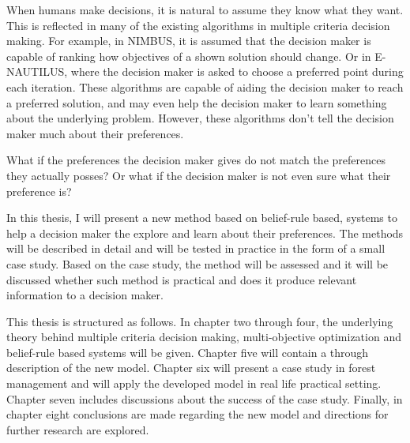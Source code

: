 When humans make decisions, it is natural to assume they know what they want.
This is reflected in many of the existing algorithms in multiple criteria decision making.
For example, in NIMBUS, it is assumed that the decision maker is capable of ranking how objectives
of a shown solution should change. Or in E-NAUTILUS, where the decision maker is asked to choose
a preferred point during each iteration. These algorithms are capable of aiding the decision maker to 
reach a preferred solution, and may even help the decision maker to learn something about the
underlying problem. However, these algorithms don't tell the decision maker much about
their preferences.

What if the preferences the decision maker gives do not match the preferences they
actually posses? Or what if the decision maker is not even sure what their preference is?

In this thesis, I will present a new method based on belief-rule based, systems to help a decision maker
the explore and learn about their preferences. The methods will be described in detail and will be tested in
practice in the form of a small case study. Based on the case study, the method will be assessed and
it will be discussed whether such method is practical and does it produce relevant information to a
decision maker.

This thesis is structured as follows. In chapter two through four, the underlying theory behind multiple
criteria decision making, multi-objective optimization and belief-rule based systems will be given. Chapter
five will contain a through description of the new model. Chapter six will present a case study in forest
management and will apply the developed model in real life practical setting. Chapter seven includes
discussions about the success of the case study. Finally, in chapter eight conclusions are made regarding
the new model and directions for further research are explored.